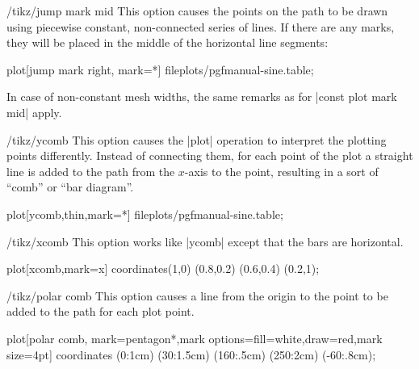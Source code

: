 \begin{key}{/tikz/jump mark mid}
    This option causes the points on the path to be drawn using piecewise
    constant, non-connected series of lines. If there are any marks, they will
    be placed in the middle of the horizontal line segments:
\begin{codeexample}[]
\tikz\draw plot[jump mark right, mark=*] file{plots/pgfmanual-sine.table};
\end{codeexample}

    In case of non-constant mesh widths, the same remarks as for
    |const plot mark mid| apply.
\end{key}

\begin{key}{/tikz/ycomb}
    This option causes the |plot| operation to interpret the plotting points
    differently. Instead of connecting them, for each point of the plot a
    straight line is added to the path from the $x$-axis to the point,
    resulting in a sort of ``comb'' or ``bar diagram''.
\begin{codeexample}[]
\tikz{} plot[ycomb,thin,mark=*] file{plots/pgfmanual-sine.table};
\end{codeexample}

\begin{codeexample}[]
\end{codeexample}
\end{key}

\begin{key}{/tikz/xcomb}
    This option works like |ycomb| except that the bars are horizontal.
\begin{codeexample}[]
\tikz \draw plot[xcomb,mark=x] coordinates{(1,0) (0.8,0.2) (0.6,0.4) (0.2,1)};
\end{codeexample}
\end{key}

\begin{key}{/tikz/polar comb}
    This option causes a line from the origin to the point to be added to the
    path for each plot point.
\begin{codeexample}[]
\tikz \draw plot[polar comb,
     mark=pentagon*,mark options={fill=white,draw=red},mark size=4pt]
   coordinates {(0:1cm) (30:1.5cm) (160:.5cm) (250:2cm) (-60:.8cm)};
\end{codeexample}
\end{key}

